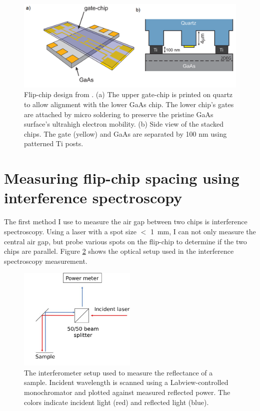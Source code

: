\documentclass[double,12pt,1in]{beavtex}
\begin{document}
\begin{figure}
    \includegraphics[width=1\textwidth]{Flip-chip design from Ref 1.png}
    \caption{Flip-chip design from \cite{beukman_noninvasive_2015}. (a) The upper gate-chip is printed on quartz to allow alignment with the lower GaAs chip. The lower chip’s gates are attached by micro soldering to preserve the pristine GaAs surface’s ultrahigh electron mobility. (b) Side view of the stacked chips. The gate (yellow) and GaAs are separated by 100 nm using patterned Ti posts.}
    \label{}
\end{figure}

\section{Measuring flip-chip spacing using interference spectroscopy}

The first method I use to measure the air gap between two chips is interference spectroscopy. Using a laser with a spot size $<$ \SI{1}{\milli\meter}, I can not only measure the central air gap, but probe various spots on the flip-chip to determine if the two chips are parallel. Figure \ref{InterfSpec} shows the optical setup used in the interference spectroscopy measurement.


\begin{figure}
    \includegraphics[width = 0.5\textwidth]{Interference spectroscopy.pdf}
    \caption{The interferometer setup used to measure the reflectance of a sample. Incident wavelength is scanned using a Labview-controlled monochromator and plotted against measured reflected power. The colors indicate incident light (red) and reflected light (blue).}
    \label{InterfSpec}
\end{figure}
\end{document}
